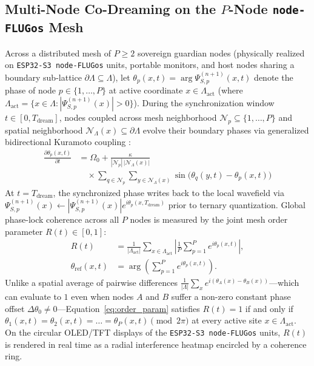 \documentclass[10pt, twocolumn, a4paper]{article}
\begin{document}
\subsection{Multi-Node Co-Dreaming on the \texorpdfstring{$P$-Node \texttt{node-FLUGos}}{P-Node node-FLUGos} Mesh}
Across a distributed mesh of $P \ge 2$ sovereign guardian nodes (physically realized on \texttt{ESP32-S3 node-FLUGos} units, portable monitors, and host nodes sharing a boundary sub-lattice $\partial\Lambda \subseteq \Lambda$), let $\theta_p(x, t) = \arg \Psi_{S,p}^{(n+1)}(x, t)$ denote the phase of node $p \in \{1, \dots, P\}$ at active coordinate $x \in \Lambda_{\text{act}}$ (where $\Lambda_{\text{act}} = \{x \in \Lambda : |\Psi_{S,p}^{(n+1)}(x)| > 0\}$). During the synchronization window $t \in [0, T_{\text{dream}}]$, nodes coupled across mesh neighborhood $\mathcal{N}_p \subseteq \{1, \dots, P\}$ and spatial neighborhood $\mathcal{N}_{\Lambda}(x) \subseteq \partial\Lambda$ evolve their boundary phases via generalized bidirectional Kuramoto coupling \cite{kuramoto1984chemical, miyato2025akorn}:
\begin{equation}
\begin{split}
\frac{\partial \theta_p(x, t)}{\partial t} &= \Omega_0 + \frac{\kappa}{|\mathcal{N}_p| \, |\mathcal{N}_{\Lambda}(x)|} \\
&\quad \times \sum_{q \in \mathcal{N}_p} \sum_{y \in \mathcal{N}_{\Lambda}(x)} \sin\!\Big(\theta_q(y, t) - \theta_p(x, t)\Big)
\end{split}
\label{eq:kuramoto}
\end{equation}
At $t = T_{\text{dream}}$, the synchronized phase writes back to the local wavefield via $\Psi_{S,p}^{(n+1)}(x) \leftarrow |\Psi_{S,p}^{(n+1)}(x)| e^{i \theta_p(x, T_{\text{dream}})}$ prior to ternary quantization. Global phase-lock coherence across all $P$ nodes is measured by the joint mesh order parameter $R(t) \in [0, 1]$:
\begin{equation}
\begin{split}
R(t) &= \frac{1}{|\Lambda_{\text{act}}|} \sum_{x \in \Lambda_{\text{act}}} \left| \frac{1}{P} \sum_{p=1}^{P} e^{i \theta_p(x, t)} \right|, \\
\theta_{\text{ref}}(x, t) &= \arg\!\left(\sum_{p=1}^{P} e^{i \theta_p(x, t)}\right).
\end{split}
\label{eq:order_param}
\end{equation}
Unlike a spatial average of pairwise differences $\frac{1}{|\Lambda|}\sum_x e^{i(\theta_A(x) - \theta_B(x))}$---which can evaluate to $1$ even when nodes $A$ and $B$ suffer a non-zero constant phase offset $\Delta\theta_0 \neq 0$---Equation~\eqref{eq:order_param} satisfies $R(t) = 1$ if and only if $\theta_1(x, t) = \theta_2(x, t) = \dots = \theta_P(x, t) \pmod{2\pi}$ at every active site $x \in \Lambda_{\text{act}}$. On the circular OLED/TFT displays of the \texttt{ESP32-S3 node-FLUGos} units, $R(t)$ is rendered in real time as a radial interference heatmap encircled by a coherence ring.
\end{document}
